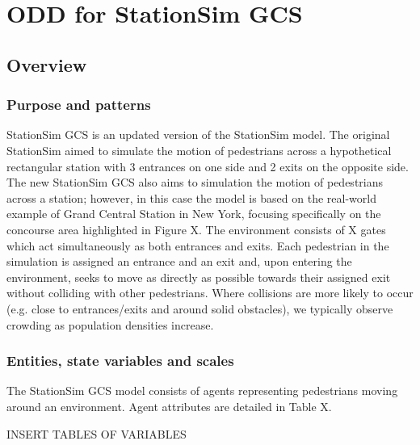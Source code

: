 \section{ODD for StationSim GCS}
\label{sec:stationsim}

\subsection{Overview}
\label{sub:stationsim:overview}

\subsubsection{Purpose and patterns}
\label{subs:stationsim:overview:purpose}

StationSim GCS is an updated version of the StationSim model.
The original StationSim aimed to simulate the motion of pedestrians across a
hypothetical rectangular station with 3 entrances on one side and 2 exits on the
opposite side.
The new StationSim GCS also aims to simulation the motion of pedestrians across
a station; however, in this case the model is based on the real-world example of
Grand Central Station in New York, focusing specifically on the concourse area
highlighted in Figure X.
The environment consists of X gates which act simultaneously as both entrances
and exits.
Each pedestrian in the simulation is assigned an entrance and an exit and, upon
entering the environment, seeks to move as directly as possible towards their
assigned exit without colliding with other pedestrians.
Where collisions are more likely to occur (e.g. close to entrances/exits and
around solid obstacles), we typically observe crowding as population densities
increase.

\subsubsection{Entities, state variables and scales}
\label{subs:stationsim:overview:entities}

The StationSim GCS model consists of agents representing pedestrians moving
around an environment.
Agent attributes are detailed in Table X.


INSERT TABLES OF VARIABLES

